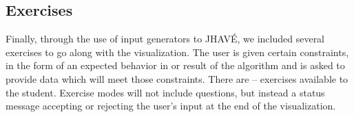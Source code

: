 \documentclass{acm_proc_article-sp}
\begin{document}
\subsection{Exercises}%
Finally, through the use of input generators to JHAVÉ, we included several exercises to go along with the visualization.
The user is given certain constraints, in the form of an expected behavior in or result of the algorithm and is asked to provide data which will meet those constraints.
There are -- exercises available to the student.
Exercise modes will not include questions, but instead a status message accepting or rejecting the user's input at the end of the visualization.
\balancecolumns
\end{document}
